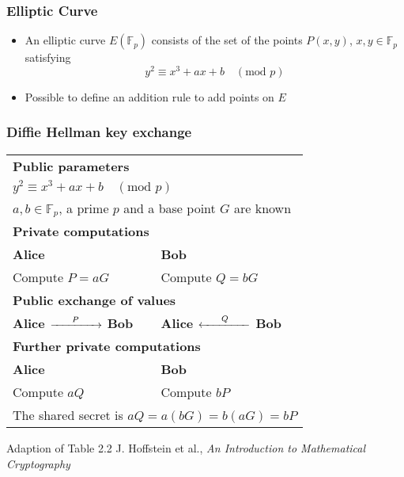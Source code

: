 \begin{frame}
  \frametitle{Elliptic Curve}
  \begin{itemize}
  \item{
  An elliptic curve $E(\mathbb{F}_p)$ consists of the set of the points $P(x,y)$, $x,y \in \mathbb{F}_p$ satisfying
  \begin{equation*}
  y^2 \equiv x^3 + ax + b \quad (\text{mod } p)
  \end{equation*}
  }
  \item{
  Possible to define an addition rule to add points on $E$
  }
  \end{itemize}
\end{frame}
\begin{frame}
  \frametitle{Diffie Hellman key exchange}
  \begin{tabular}{|p{5cm} p{5cm} |}
      \hline			
      \multicolumn{2}{|p{10cm}|}{\rule{0em}{1.2em}\bf{Public parameters}}\\
      \multicolumn{2}{|p{10cm}|}{$ y^2 \equiv x^3 + ax + b \quad (\text{mod } p)$}\\
      \multicolumn{2}{|p{10cm}|}{$a,b \in \mathbb{F}_p$, a prime $p$ and a base point $G$ are known}\\
      \hline
      \multicolumn{2}{|p{10cm}|}{\rule{0em}{1.2em}\bf{Private computations}}\\
      \bf{\small{Alice}} & \bf{\small{Bob}}\\
      Compute $P = aG$ &  Compute $Q = bG$ \\
      \hline
      \multicolumn{2}{|p{10cm}|}{\rule{0em}{1.2em}\bf{Public exchange of values}}\\
      \bf{\small{Alice}} $\xrightarrow{\hspace*{0.6cm}P\hspace*{0.6cm}}$ \bf{\small{Bob}}
      &
      \bf{\small{Alice}} $\xleftarrow{\hspace*{0.6cm}Q\hspace*{0.6cm}}$ \bf{\small{Bob}}
      \\
      \hline
      \multicolumn{2}{|p{10cm}|}{\rule{0em}{1.2em}\bf{Further private computations}}\\
      \bf{\small{Alice}} & \bf{\small{Bob}}\\
      Compute $aQ$ & Compute $bP$ \\
      \multicolumn{2}{|p{10cm}|}{
      The shared secret is $aQ = a(bG) = b(aG) = bP$}\\ \hline
    \end{tabular}
    \vfill
    \tiny{Adaption of Table 2.2 J. Hoffstein et al., \emph{An Introduction to Mathematical Cryptography}}
\end{frame}
